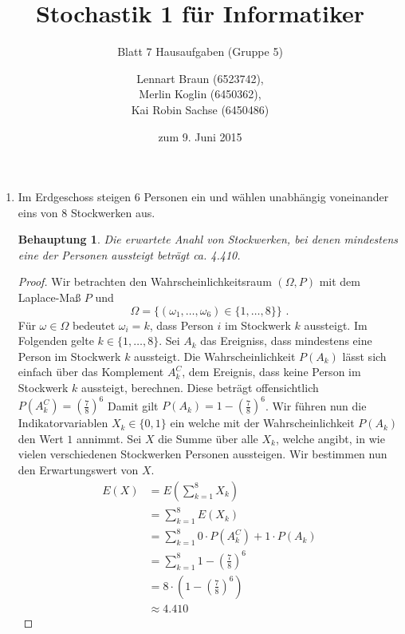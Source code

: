 \documentclass[a4paper]{scrartcl}
\title{Stochastik 1 für Informatiker}
\subtitle{Blatt 7 Hausaufgaben (Gruppe 5)}
\author{
    Lennart Braun (6523742), \\
    Merlin Koglin (6450362), \\
    Kai Robin Sachse (6450486)
}
\date{zum 9. Juni 2015}
\newtheorem*{behaupt}{Behauptung}
\begin{document}
\maketitle

\begin{enumerate}[label=\bfseries\arabic*.]
    \item
        Im Erdgeschoss steigen 6 Personen ein und wählen unabhängig voneinander
        eins von 8 Stockwerken aus.
        \begin{behaupt}
            Die erwartete Anahl von Stockwerken, bei denen mindestens eine der
            Personen aussteigt beträgt ca. \num{4,410}.
        \end{behaupt}
        \begin{proof}
            Wir betrachten den Wahrscheinlichkeitsraum $(\Omega, P)$ mit dem
            Laplace-Maß $P$ und
            \begin{equation*}
                \Omega = \Big\{ (\omega_1, \ldots, \omega_6)
                                \in \{1, \ldots, 8\} \Big\}
                \text{ .}
            \end{equation*}
            Für $\omega \in \Omega$ bedeutet $\omega_i = k$, dass Person $i$ im
            Stockwerk $k$ aussteigt.
            Im Folgenden gelte $k \in \{1, \ldots, 8\}$.
            Sei $A_k$ das Ereigniss, dass mindestens eine Person im Stockwerk
            $k$ aussteigt.
            Die Wahrscheinlichkeit $P(A_k)$ lässt sich einfach über das
            Komplement $A_k^C$, dem Ereignis, dass keine Person im Stockwerk $k$
            aussteigt, berechnen.
            Diese beträgt offensichtlich $P(A_k^C) = \left(\frac{7}{8}\right)^6$
            Damit gilt $P(A_k) = 1 - \left( \frac{7}{8} \right)^6$.
            Wir führen nun die Indikatorvariablen $X_k \in \{0, 1\}$ ein welche
            mit der Wahrscheinlichkeit $P(A_k)$ den Wert $1$ annimmt.
            Sei $X$ die Summe über alle $X_k$, welche angibt, in wie vielen
            verschiedenen Stockwerken Personen aussteigen.
            Wir bestimmen nun den Erwartungswert von $X$.
            \begin{equation*}
                \begin{split}
                    E(X) &= E \left( \sum_{k = 1}^8 X_k \right) \\
                         &= \sum_{k = 1}^8 E(X_k) \\
                         &= \sum_{k = 1}^8 0 \cdot P(A_k^C) + 1 \cdot P(A_k) \\
                         &= \sum_{k = 1}^8 1 - \left( \frac{7}{8} \right)^6 \\
                         &= 8 \cdot
                            \left( 1 - \left( \frac{7}{8} \right)^6 \right) \\
                         &\approx \num{4,410}
                \end{split}
            \end{equation*}
        \end{proof}


\end{enumerate}
\end{document}
